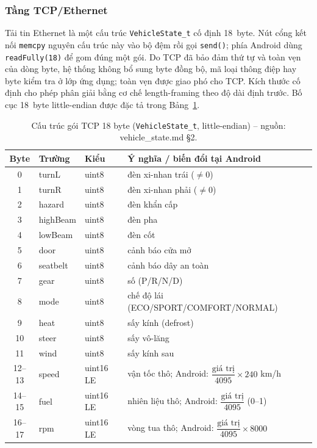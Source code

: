\documentclass[../DoAn.tex]{subfiles}
\begin{document}
\subsubsection{Tầng TCP/Ethernet}

Tải tin Ethernet là một cấu trúc \texttt{VehicleState\_t} cố định 18~byte. Nút
cổng kết nối \texttt{memcpy} nguyên cấu trúc này vào bộ đệm rồi gọi
\texttt{send()}; phía Android dùng \texttt{readFully(18)} để gom đúng một gói.
Do TCP đã bảo đảm thứ tự và toàn vẹn của dòng byte, hệ thống không bổ sung byte
đồng bộ, mã loại thông điệp hay byte kiểm tra ở lớp ứng dụng; toàn vẹn được giao
phó cho TCP. Kích thước cố định cho phép phân giải bằng cơ chế length-framing
theo độ dài định trước. Bố cục 18~byte little-endian được đặc tả trong
Bảng~\ref{tab:tcp-packet}.

\begin{table}[H]
  \centering
  \caption{Cấu trúc gói TCP 18 byte (\texttt{VehicleState\_t}, little-endian) -- nguồn: vehicle\_state.md §2.}
  \label{tab:tcp-packet}
  \begin{tabular}{@{}cllp{5.2cm}@{}}
    \toprule
    \textbf{Byte} & \textbf{Trường} & \textbf{Kiểu} & \textbf{Ý nghĩa / biến đổi tại Android} \\
    \midrule
    0  & turnL    & uint8 & đèn xi-nhan trái ($\ne 0$) \\
    1  & turnR    & uint8 & đèn xi-nhan phải ($\ne 0$) \\
    2  & hazard   & uint8 & đèn khẩn cấp \\
    3  & highBeam & uint8 & đèn pha \\
    4  & lowBeam  & uint8 & đèn cốt \\
    5  & door     & uint8 & cảnh báo cửa mở \\
    6  & seatbelt & uint8 & cảnh báo dây an toàn \\
    7  & gear     & uint8 & số (P/R/N/D) \\
    8  & mode     & uint8 & chế độ lái (ECO/SPORT/COMFORT/NORMAL) \\
    9  & heat     & uint8 & sấy kính (defrost) \\
    10 & steer    & uint8 & sấy vô-lăng \\
    11 & wind     & uint8 & sấy kính sau \\
    12--13 & speed & uint16 LE & vận tốc thô; Android: $\dfrac{\text{giá trị}}{4095}\times240$ km/h \\
    14--15 & fuel  & uint16 LE & nhiên liệu thô; Android: $\dfrac{\text{giá trị}}{4095}$ (0--1) \\
    16--17 & rpm   & uint16 LE & vòng tua thô; Android: $\dfrac{\text{giá trị}}{4095}\times8000$ \\
    \bottomrule
  \end{tabular}
\end{table}
\end{document}
